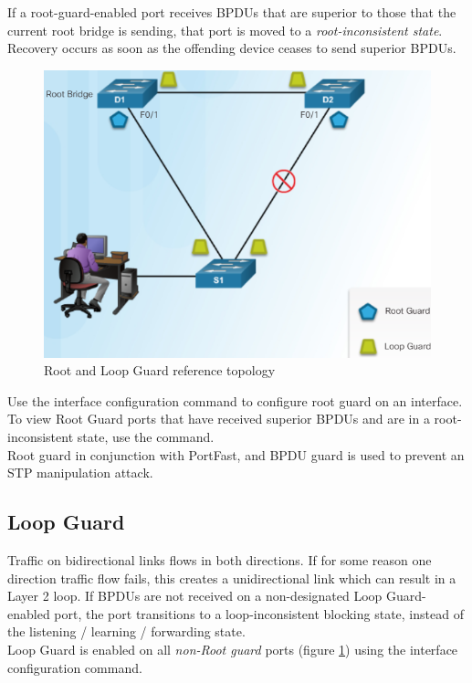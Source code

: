 If a root-guard-enabled port receives BPDUs that are superior to those that the current root bridge is sending, that port is moved to a \emph{root-inconsistent state}. Recovery occurs as soon as the offending device ceases to send superior BPDUs.\\



\begin{figure}[hbtp]
\caption{Root and Loop Guard reference topology}\label{RootLoopGuard}
\centering
\includegraphics[scale=0.5]{pictures/RootLoopGuard.PNG}
\end{figure}


Use the  interface configuration command to configure root guard on an interface. To view Root Guard ports that have received superior BPDUs and are in a root-inconsistent state, use the  command.\\

Root guard in conjunction with PortFast, and BPDU guard is used to prevent an STP manipulation attack.

\subsection{Loop Guard}

Traffic on bidirectional links flows in both directions. If for some reason one direction traffic flow fails, this creates a unidirectional link which can result in a Layer 2 loop. If BPDUs are not received on a non-designated Loop Guard-enabled port, the port transitions to a loop-inconsistent blocking state, instead of the listening / learning / forwarding state. \\

Loop Guard is enabled on all \emph{non-Root guard} ports (figure \ref{RootLoopGuard}) using the  interface configuration command.